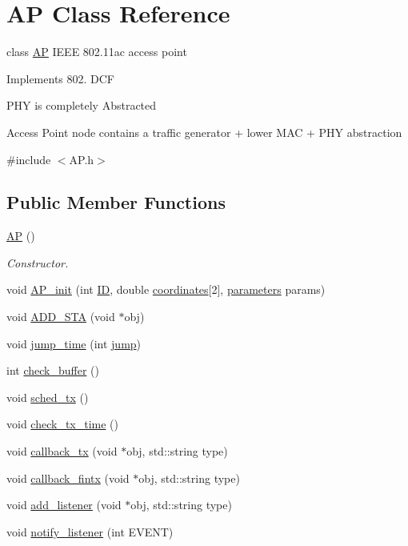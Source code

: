 \hypertarget{classAP}{\section{A\-P Class Reference}
\label{classAP}
}


class \hyperlink{classAP}{A\-P} I\-E\-E\-E 802.\-11ac access point\par
 Implements 802. D\-C\-F \par
P\-H\-Y is completely Abstracted \par
Access Point node contains a traffic generator + lower M\-A\-C + P\-H\-Y abstraction \par
 




{\ttfamily \#include $<$A\-P.\-h$>$}

\subsection*{Public Member Functions}
\begin{DoxyCompactItemize}
\item 
\hyperlink{classAP_a450b71a165e04a949b2a6ac2cee52ada}{A\-P} ()
\begin{DoxyCompactList}\small\item\em Constructor. \end{DoxyCompactList}\item 
void \hyperlink{classAP_a760aaef70814dfae063d6ece269c1c4f}{A\-P\-\_\-init} (int \hyperlink{classAP_a5f6f67357a37b369b8967ce354ede5dd}{I\-D}, double \hyperlink{classAP_ac52816d18c4dc26158fa3bd2e63f3bcc}{coordinates}\mbox{[}2\mbox{]}, \hyperlink{structparameters}{parameters} params)
\item 
void \hyperlink{classAP_a3f59f981ce41a48920b1f562458f172a}{A\-D\-D\-\_\-\-S\-T\-A} (void $\ast$obj)
\item 
void \hyperlink{classAP_aed131ad29feadc849b4084aa4b834b4f}{jump\-\_\-time} (int \hyperlink{scenenario__nAP__nSTA__ncell__multi__thread_8cpp_a17538519ca141179ae5cee37717e7843}{jump})
\item 
int \hyperlink{classAP_a53b75e708569ab2e091e7bea44c818cc}{check\-\_\-buffer} ()
\item 
void \hyperlink{classAP_a258b9d998a17960b46fa63be4c074191}{sched\-\_\-tx} ()
\item 
void \hyperlink{classAP_a2505141a8549254109809cf4d51fcb41}{check\-\_\-tx\-\_\-time} ()
\item 
void \hyperlink{classAP_aa9b74decf60f64824cfe1fbe064fb013}{callback\-\_\-tx} (void $\ast$obj, std\-::string type)
\item 
void \hyperlink{classAP_a8a4bd1f49be8ac6db837cbdfb6428126}{callback\-\_\-fintx} (void $\ast$obj, std\-::string type)
\item 
void \hyperlink{classAP_a2ba3017a1ce9fb3270bf9ce3232a0c3a}{add\-\_\-listener} (void $\ast$obj, std\-::string type)
\item 
void \hyperlink{classAP_a2fb3ca1e5be18f3542ca091215ac95a2}{notify\-\_\-listener} (int E\-V\-E\-N\-T)
\end{DoxyCompactItemize}
